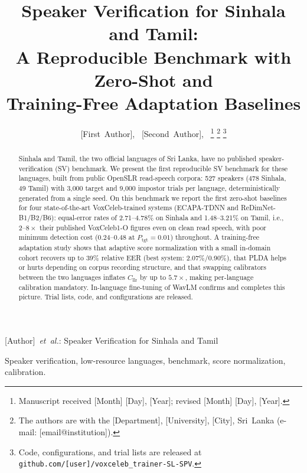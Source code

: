 \documentclass[journal]{IEEEtran}
\begin{document}
\title{Speaker Verification for Sinhala and Tamil:\\
A Reproducible Benchmark with Zero-Shot and\\
Training-Free Adaptation Baselines}

\author{%
    [First~Author],~
    [Second~Author],~
\thanks{Manuscript received [Month] [Day], [Year]; revised [Month] [Day], [Year].}%
\thanks{The authors are with the [Department], [University],
[City], Sri~Lanka (e-mail: [email@institution]).}%
\thanks{Code, configurations, and trial lists are released at
\texttt{github.com/[user]/voxceleb\_trainer-SL-SPV}.}}

%
{[Author]~\MakeLowercase{\textit{et~al.}}: Speaker Verification for
Sinhala and Tamil}

\maketitle

\begin{abstract}
Sinhala and Tamil, the two official languages of Sri Lanka, have no
published speaker-verification (SV) benchmark. We present the first
reproducible SV benchmark for these languages, built from public
OpenSLR read-speech corpora: 527 speakers (478 Sinhala, 49 Tamil)
with 3{,}000 target and 9{,}000 impostor trials per language,
deterministically generated from a single seed. On this benchmark we
report the first zero-shot baselines for four state-of-the-art
VoxCeleb-trained systems (ECAPA-TDNN and ReDimNet-B1/B2/B6):
equal-error rates of 2.71--4.78\% on Sinhala and 1.48--3.21\% on
Tamil, i.e., $2$--$8\times$ their published VoxCeleb1-O figures even
on clean read speech, with poor minimum detection cost
(0.24--0.48 at $P_{\mathrm{tgt}}{=}0.01$) throughout. A training-free
adaptation study shows that adaptive score normalization with a small
in-domain cohort recovers up to 39\% relative EER (best system:
2.07\%/0.90\%), that PLDA helps or hurts depending on corpus recording
structure, and that swapping calibrators between the two languages
inflates $C_{\mathrm{llr}}$ by up to $5.7\times$, making per-language
calibration mandatory. In-language fine-tuning of WavLM confirms and
completes this picture. Trial lists, code, and configurations are
released.
\end{abstract}

\begin{IEEEkeywords}
Speaker verification, low-resource languages, benchmark,
score normalization, calibration.
\end{IEEEkeywords}
\end{document}

